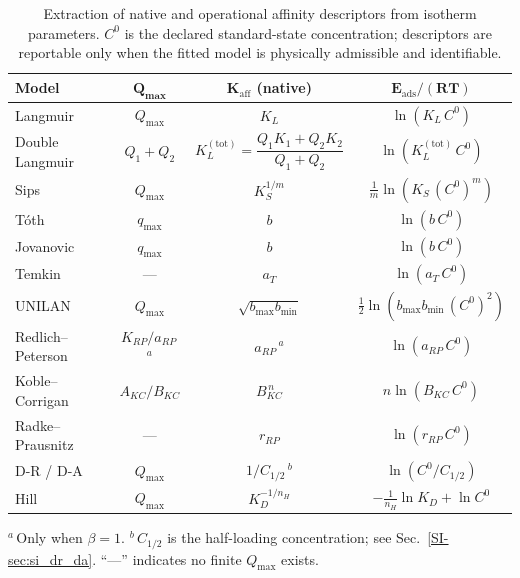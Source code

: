 \documentclass[journal=jacsat,manuscript=article]{achemso}
\begin{document}
	\begin{table}[H]
		\small
		\caption{Extraction of native and operational affinity descriptors from isotherm parameters. $C^{0}$ is the declared standard-state concentration; descriptors are reportable only when the fitted model is physically admissible and identifiable.}
		\label{tab:extraction}
		\renewcommand{\arraystretch}{1.3}
		\begin{tabular}{@{} l c c c @{}}
			\hline
			\textbf{Model}
			& $\boldsymbol{Q_{\max}}$
			& $\boldsymbol{K_{\mathrm{aff}}}$ \textbf{(native)}
			& $\boldsymbol{E_{\mathrm{ads}}/(RT)}$ \\
			\hline
			Langmuir
			& $Q_{\max}$
			& $K_L$
			& $\ln(K_L\, C^{0})$ \\
			Double Langmuir
			& $Q_1 + Q_2$
			& $K_L^{\mathrm{(tot)}} = \dfrac{Q_1K_1 + Q_2K_2}{Q_1+Q_2}$
			& $\ln(K_L^{\mathrm{(tot)}}\, C^{0})$ \\
			Sips
			& $Q_{\max}$
			& $K_S^{1/m}$
			& $\frac{1}{m}\ln(K_S\, (C^{0})^{m})$ \\
			T\'{o}th
			& $q_{\max}$
			& $b$
			& $\ln(b\, C^{0})$ \\
			Jovanovic
			& $q_{\max}$
			& $b$
			& $\ln(b\, C^{0})$ \\
			Temkin
			& ---
			& $a_T$
			& $\ln(a_T\, C^{0})$ \\
			UNILAN
			& $Q_{\max}$
			& $\sqrt{b_{\max} b_{\min}}$
			& $\tfrac{1}{2}\ln(b_{\max} b_{\min}\,(C^{0})^{2})$ \\
			Redlich--Peterson
			& $K_{RP}/a_{RP}$\,$^{a}$
			& $a_{RP}$\,$^{a}$
			& $\ln(a_{RP}\, C^{0})$ \\
			Koble--Corrigan
			& $A_{KC}/B_{KC}$
			& $B_{KC}^{\,n}$
			& $n\ln(B_{KC}\, C^{0})$ \\
			Radke--Prausnitz
			& ---
			& $r_{RP}$
			& $\ln(r_{RP}\, C^{0})$ \\
			D-R / D-A
			& $Q_{\max}$
			& $1/C_{1/2}$\,$^{b}$
			& $\ln(C^{0}/C_{1/2})$ \\
			Hill
			& $Q_{\max}$
			& $K_D^{-1/n_H}$
			& $-\frac{1}{n_H}\ln K_D + \ln C^{0}$ \\
			\hline
		\end{tabular}

		\smallskip
		\noindent $^{a}$\,Only when $\beta = 1$.\quad
		$^{b}$\,$C_{1/2}$ is the half-loading concentration; see Sec.~\ref{SI-sec:si_dr_da}.\quad
		``---'' indicates no finite $Q_{\max}$ exists.
	\end{table}
\end{document}
